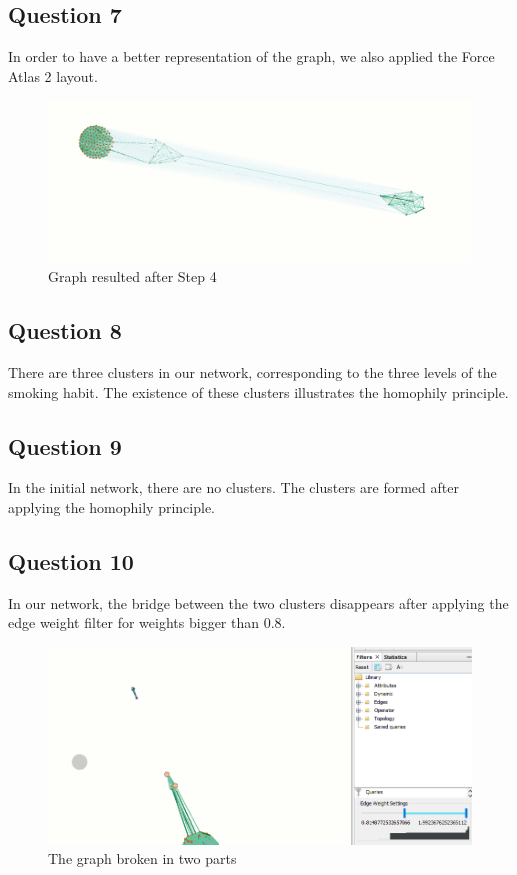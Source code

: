 \documentclass[a4paper]{article}
\begin{document}
\subsection{Question 7}

In order to have a better representation of the graph, we also applied the Force Atlas 2 layout.

\begin{figure}[H]
\centering
\includegraphics[width=\textwidth]{res/img/q17graph.png}
\caption{Graph resulted after Step 4}
\label{fig:network_output}
\end{figure}

\subsection{Question 8}

There are three clusters in our network, corresponding to the three levels of the smoking habit. The existence of these clusters illustrates the homophily principle.

\subsection{Question 9}
In the initial network, there are no clusters. The clusters are formed after applying the homophily principle. 

\subsection{Question 10}

In our network, the bridge between the two clusters disappears after applying the edge weight filter for weights bigger than 0.8.

\begin{figure}[H]
\centering
\includegraphics[width=\textwidth]{res/img/bridge.png}
\caption{The graph broken in two parts}
\label{fig:network_output}
\end{figure}
\end{document}
